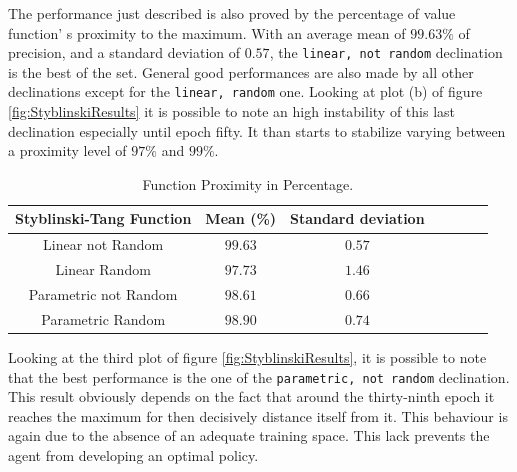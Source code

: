 The performance just described is also proved by the percentage of value function' s proximity to the maximum. With an average mean of $99.63\%$ of precision, and a standard deviation of $0.57$, the {\tt linear, not random} declination is the best of the set. General good performances are also made by all other declinations except for the {\tt linear, random} one. Looking at plot (b) of figure \ref{fig:StyblinskiResults} it is possible to note an high instability of this last declination especially until epoch fifty. It than starts to stabilize varying between a proximity level of $97\%$ and $99\%$.

\begin{table}[h!]
	\centering
	\resizebox{\linewidth}{!} {
		\begin{tabular}{c| cccccc} 
			\hline \textbf{Styblinski-Tang Function}
			& \textbf{Mean (\%)} & \textbf{Standard deviation}\\ 
			\hline Linear not Random
			& \cellcolor{green!25}$99.63$ & \cellcolor{green!25}$0.57$ \\ 
			\hline Linear Random
			& $97.73$ & $1.46$ \\ 
			\hline Parametric not Random
			& $98.61$ & $0.66$\\ 
			\hline Parametric Random
			& $98.90$ & $0.74$\\ 
			\hline 
		\end{tabular} 
	}
	\label{StyblinskiTabProximity}
	\caption{Function Proximity in Percentage.} 
\end{table}

Looking at the third plot of figure \ref{fig:StyblinskiResults}, it is possible to note that the best performance is the one of the {\tt parametric, not random} declination. This result obviously depends on the fact that around the thirty-ninth epoch it reaches the maximum for then decisively distance itself from it. This behaviour is again due to the absence of an adequate training space. This lack prevents the agent from developing an optimal policy.

